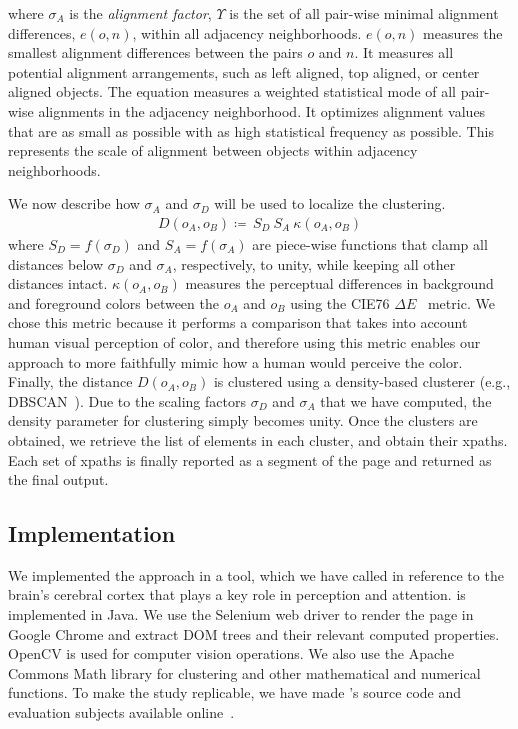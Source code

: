 where $\sigma_A$ is the \emph{alignment factor},
$\Upsilon$ is the set of all pair-wise minimal alignment differences, $e(o, n)$,
within all adjacency neighborhoods.
$e(o, n)$ measures the smallest alignment differences between the pairs $o$ and $n$. 
It measures all potential alignment arrangements, such as left aligned, top aligned,
or center aligned objects. 
The equation measures a weighted statistical mode of all pair-wise
alignments in the adjacency neighborhood.
It optimizes alignment values that are as small as possible with as high
statistical frequency as possible.
This represents the scale of alignment between objects within adjacency neighborhoods.

We now describe how $\sigma_A$ and $\sigma_D$ will be used to localize the clustering.
\begin{align}
D(o_A, o_B) \coloneqq \, S_D \: S_A \: \kappa(o_A, o_B)
\end{align}
where $S_D = f(\sigma_D)$ and $S_A = f(\sigma_A)$ are piece-wise functions
that clamp all distances below $\sigma_D$ and $\sigma_A$, respectively, to unity,
while keeping all other distances intact.
$\kappa(o_A, o_B)$ measures the perceptual differences in
background and foreground colors between the $o_A$ and $o_B$ using 
the CIE76 $\Delta{E}$~\cite{klein2010industrial} metric.
We chose this metric because it performs a comparison that takes into account
human visual perception of color, and therefore using this metric enables 
our approach to more faithfully mimic how a human would perceive the color.
Finally, the distance $D(o_A, o_B)$ is clustered using a density-based
clusterer (e.g., DBSCAN~\cite{ester1996density}).
Due to the scaling factors $\sigma_D$ and $\sigma_A$ that we have computed,
the density parameter for clustering simply becomes unity.
Once the clusters are obtained,
we retrieve the list of elements in each cluster, and
obtain their xpaths.
Each set of xpaths is finally reported as a segment
of the page and returned as the final output.

\subsection{Implementation}
We implemented the approach in a tool,
which we have called \toolname in reference to the brain's
cerebral cortex that plays a key role in perception and attention.
\toolname is implemented in Java.
We use the Selenium web driver to render the page in Google Chrome
and extract DOM trees and their relevant computed properties.
OpenCV is used for computer vision operations.
We also use the Apache Commons Math library for clustering and other
mathematical and numerical functions.
To make the study replicable, we have made {\toolname}'s source code 
and evaluation subjects available online~\cite{tool-and-data}.

